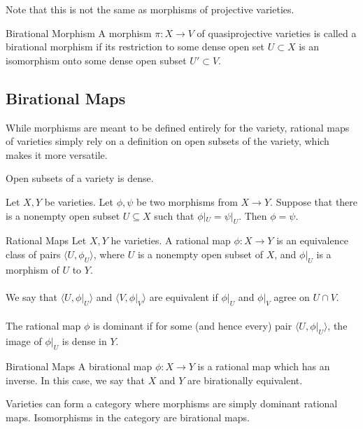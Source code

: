 \documentclass[a4paper]{article}
\begin{document}
Note that this is not the same as morphisms of projective varieties. 

\begin{defn}{Birational Morphism}{} A morphism $\pi:X\to V$ of quasiprojective varieties is called a birational morphism if its restriction to some dense open set $U\subset X$ is an isomorphism onto some dense open subset $U'\subset V$. 
\end{defn}

\subsection{Birational Maps}
While morphisms are meant to be defined entirely for the variety, rational maps of varieties simply rely on a definition on open subsets of the variety, which makes it more versatile. 

\begin{lmm}{}{} Open subsets of a variety is dense. 
\end{lmm}

\begin{lmm}{}{} Let $X,Y$ be varieties. Let $\phi,\psi$ be two morphisms from $X\to Y$. Suppose that there is a nonempty open subset $U\subseteq X$ such that $\phi|_U=\psi|_U$. Then $\phi=\psi$. 
\end{lmm}

\begin{defn}{Rational Maps}{} Let $X,Y$ he varieties. A rational map $\phi:X\to Y$ is an equivalence class of pairs $\langle U,\phi_U\rangle$, where $U$ is a nonempty open subset of $X$, and $\phi|_U$ is a morphism of $U$ to $Y$. \\~\\
We say that $\langle U,\phi|_U\rangle$ and $\langle V,\phi|_V\rangle$ are equivalent if $\phi|_U$ and $\phi|_V$ agree on $U\cap V$. \\~\\
The rational map $\phi$ is dominant if for some (and hence every) pair $\langle U,\phi|_U\rangle$, the image of $\phi|_U$ is dense in $Y$. 
\end{defn}

\begin{defn}{Birational Maps}{} A birational map $\phi:X\to Y$ is a rational map which has an inverse. In this case, we say that $X$ and $Y$ are birationally equivalent. 
\end{defn}

Varieties can form a category where morphisms are simply dominant rational maps. Isomorphisms in the category are birational maps. 
\end{document}
